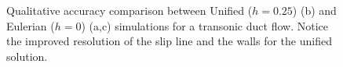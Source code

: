 \documentclass[12pt,letterpaper]{article}
\begin{document}
\begin{figure}[htbp]
   \centering
   \begin{subfigmatrix}{2}
   \end{subfigmatrix}
   \caption[Accuracy Comparison Between Moving and Stationary
   grids]{Qualitative accuracy comparison between Unified ($h=0.25$)
     (b) and Eulerian ($h=0$) (a,c) simulations for a transonic duct
     flow. Notice the improved resolution of the slip line and the
     walls for the unified solution.}
   \label{fig:duct_verification}
\end{figure}
   
\end{document}
